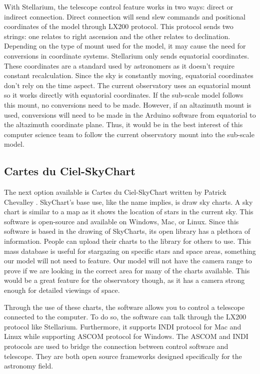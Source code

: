 \documentclass[12pt]{report}
\begin{document}
With Stellarium, the telescope control feature works in two ways: direct or indirect connection. Direct connection will send slew commands and positional coordinates of the model through LX200 protocol. This protocol sends two strings: one relates to right ascension and the other relates to declination. Depending on the type of mount used for the model, it may cause the need for conversions in coordinate systems. Stellarium only sends equatorial coordinates. These coordinates are a standard used by astronomers as it doesn't require constant recalculation. Since the sky is constantly moving, equatorial coordinates don't rely on the time aspect. The current observatory uses an equatorial mount so it works directly with equatorial coordinates. If the sub-scale model follows this mount, no conversions need to be made. However, if an altazimuth mount is used, conversions will need to be made in the Arduino software from equatorial to the altazimuth coordinate plane. Thus, it would be in the best interest of this computer science team to follow the current observatory mount into the sub-scale model.

\subsection*{Cartes du Ciel-SkyChart}

The next option available is Cartes du Ciel-SkyChart written by Patrick Chevalley \cite{skychart}. SkyChart's base use, like the name implies, is draw sky charts. A sky chart is similar to a map as it shows the location of stars in the current sky. This software is open-source and available on Windows, Mac, or Linux. Since this software is based in the drawing of SkyCharts, its open library has a plethora of information. People can upload their charts to the library for others to use. This mass database is useful for stargazing on specific stars and space areas, something our model will not need to feature. Our model will not have the camera range to prove if we are looking in the correct area for many of the charts available. This would be a great feature for the observatory though, as it has a camera strong enough for detailed viewings of space.

Through the use of these charts, the software allows you to control a telescope connected to the computer. To do so, the software can talk through the LX200 protocol like Stellarium. Furthermore, it supports INDI protocol for Mac and Linux while supporting ASCOM protocol for Windows. The ASCOM and INDI protocols are used to bridge the connection between control software and telescope. They are both open source frameworks designed specifically for the astronomy field.
\end{document}
